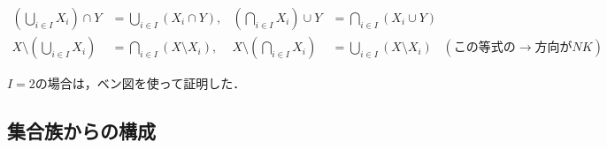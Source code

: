 \documentclass[uplatex,dvipdfmx]{jsreport}
\begin{document}
\begin{proposition}\label{prop-de-Morgan's-law}
    \begin{align*}
        \left(\bigcup_{i\in I}X_i\right)\cap Y &= \bigcup_{i\in I}(X_i\cap Y), &\left(\bigcap_{i\in I}X_i\right)\cup Y &= \bigcap_{i\in I}(X_i\cup Y)\\
        X\setminus\left(\bigcup_{i\in I}X_i\right)&=\bigcap_{i\in I}(X\setminus X_i), &X\setminus\left(\bigcap_{i\in I}X_i\right)&=\bigcup_{i\in I}(X\setminus X_i)\;\;\;(この等式の\rightarrow 方向がNK)
    \end{align*}
\end{proposition}
$I=2$の場合は，ベン図を使って証明した．

\subsection{集合族からの構成}
\end{document}
